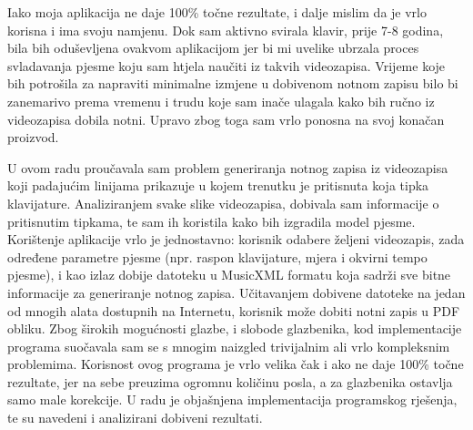 \documentclass[times, utf8, zavrsni, numeric]{fer}
\begin{document}
Iako moja aplikacija ne daje 100\% točne rezultate, i dalje mislim da je vrlo korisna i ima svoju namjenu. Dok sam aktivno svirala klavir, prije 7-8 godina, bila bih oduševljena ovakvom aplikacijom jer bi mi uvelike ubrzala proces svladavanja pjesme koju sam htjela naučiti iz takvih videozapisa. Vrijeme koje bih potrošila za napraviti minimalne izmjene u dobivenom notnom zapisu bilo bi zanemarivo prema vremenu i trudu koje sam inače ulagala kako bih ručno iz videozapisa dobila notni. Upravo zbog toga sam vrlo ponosna na svoj konačan proizvod.




\begin{sazetak}
U ovom radu proučavala sam problem generiranja notnog zapisa iz videozapisa koji padajućim linijama prikazuje u kojem trenutku je pritisnuta koja tipka klavijature. Analiziranjem svake slike videozapisa, dobivala sam informacije o pritisnutim tipkama, te sam ih koristila kako bih izgradila model pjesme. Korištenje aplikacije vrlo je jednostavno: korisnik odabere željeni videozapis, zada određene parametre pjesme (npr. raspon klavijature, mjera i okvirni tempo pjesme), i kao izlaz dobije datoteku u MusicXML formatu koja sadrži sve bitne informacije za generiranje notnog zapisa. Učitavanjem dobivene datoteke na jedan od mnogih alata dostupnih na Internetu, korisnik može dobiti notni zapis u PDF obliku. Zbog širokih mogućnosti glazbe, i slobode glazbenika, kod implementacije programa suočavala sam se s mnogim naizgled trivijalnim ali vrlo kompleksnim problemima. Korisnost ovog programa je vrlo velika čak i ako ne daje 100\% točne rezultate, jer na sebe preuzima ogromnu količinu posla, a za glazbenika ostavlja samo male korekcije. U radu je objašnjena implementacija programskog rješenja, te su navedeni i analizirani dobiveni rezultati.

\end{sazetak}

\pagebreak
\end{document}
